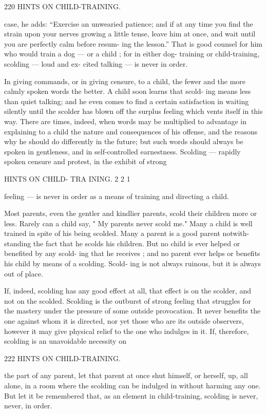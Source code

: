 \documentclass[
]{book}
\begin{document}
220 HINTS ON CHILD-TRAINING.

case, he adds: ``Exercise an unwearied patience; and if at any time you find the strain upon your nerves growing a little tense, leave him at once, and wait until you are perfectly calm before resum- ing the lesson.'' That is good counsel for him who would train a dog --- or a child ; for in either dog- training or child-training, scolding --- loud and ex- cited talking --- is never in order.

In giving commands, or in giving censure, to a child, the fewer and the more calmly spoken words the better. A child soon learns that scold- ing means less than quiet talking; and he even comes to find a certain satisfaction in waiting silently until the scolder has blown off the surplus feeling which vents itself in this way. There are times, indeed, when words may be multiplied to advantage in explaining to a child the nature and consequences of his offense, and the reasons why he should do differently in the future; but such words should always be spoken in gentleness, and in self-controlled earnestness. Scolding --- rapidly spoken censure and protest, in the exhibit of strong

HINTS ON CHILD- TRA INING. 2 2 1

feeling --- is never in order as a means of training and directing a child.

Most parents, even the gentler and kindlier parents, scold their children more or less. Rarely can a child say, " My parents never scold me." Many a child is well trained in spite of his being scolded. Many a parent is a good parent notwith- standing the fact that he scolds his children. But no child is ever helped or benefited by any scold- ing that he receives ; and no parent ever helps or benefits his child by means of a scolding. Scold- ing is not always ruinous, but it is always out of place.

If, indeed, scolding has any good effect at all, that effect is on the scolder, and not on the scolded. Scolding is the outburst of strong feeling that struggles for the mastery under the pressure of some outside provocation. It never benefits the one against whom it is directed, nor yet those who are its outside observers, however it may give physical relief to the one who indulges in it. If, therefore, scolding is an unavoidable necessity on

222 HINTS ON CHILD-TRAINING.

the part of any parent, let that parent at once shut himself, or herself, up, all alone, in a room where the scolding can be indulged in without harming any one. But let it be remembered that, as an element in child-training, scolding is never, never, in order.
\end{document}
